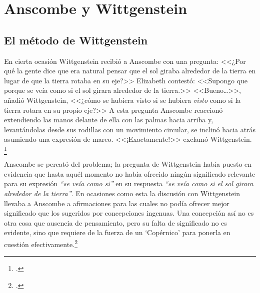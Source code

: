 

\section{Anscombe y Wittgenstein}

\subsection{El método de Wittgenstein}

En cierta ocasión Wittgenstein recibió a Anscombe con una pregunta: <<¿Por qué la
gente dice que era natural pensar que el sol giraba alrededor de la tierra en
lugar de que la tierra rotaba en su eje?>> Elizabeth contestó: <<Supongo que
porque se veía como si el sol girara alrededor de la tierra.>> <<Bueno\ldots>>,
añadió Wittgenstein, <<¿cómo se hubiera visto si se hubiera \emph{visto} como si
la tierra rotara en su propio eje?>> A esta pregunta Anscombe reaccionó
extendiendo las manos delante de ella con las palmas hacia arriba y,
levantándolas desde sus rodillas con un movimiento circular, se inclinó hacia
atrás asumiendo una expresión de mareo. <<¡Exactamente!>> exclamó Wittgenstein.
\footcite[cf.][151]{IWT}   


Anscombe se percató del problema; la pregunta de Wittgenstein había puesto en
evidencia que hasta aquél momento no había ofrecido ningún significado relevante
para su expresión \emph{``se veía como si''} en su respuesta \emph{``se veía
    como si el sol girara alrededor de la tierra''}.  En ocasiones como esta la
discusión con Wittgenstein llevaba a Anscombe a afirmaciones para las cuales no
podía ofrecer mejor significado que los sugeridos por concepciones ingenuas. Una
concepción así no es otra cosa que ausencia de pensamiento, pero su falta de
significado no es evidente, sino que requiere de la fuerza de un `Copérnico'
para ponerla en cuestión efectivamente.\footcite[cf. 151]{IWT} 

